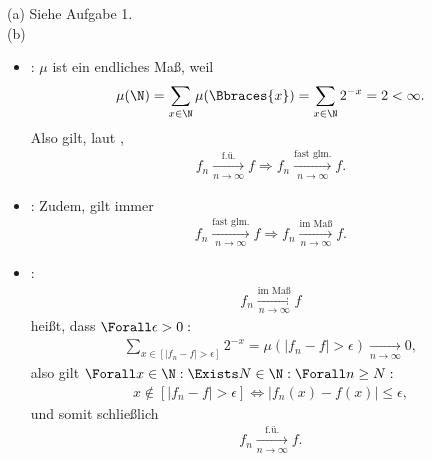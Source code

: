 \begin{solution}

(a) Siehe Aufgabe 1. \\

(b) \phantom{}

\begin{itemize}

  \item {}: $\mu$ ist ein endliches Maß, weil
  \begin{align*}
    \mu(\N)
    =
    \sum_{x \in \N} \mu(\Bbraces{x})
    =
    \sum_{x \in \N} 2^{-x}
    =
    2 < \infty.
  \end{align*}
  Also gilt, laut ,
  \begin{align*}
    f_n \xrightarrow[n \to \infty]{\text{f.ü.}} f
    \Rightarrow
    f_n \xrightarrow[n \to \infty]{\text{fast glm.}} f.
  \end{align*}

  \item {}: Zudem, gilt immer
  \begin{align*}
    f_n \xrightarrow[n \to \infty]{\text{fast glm.}} f
    \Rightarrow
    f_n \xrightarrow[n \to \infty]{\text{im Maß}} f.
  \end{align*}

  \item {}:
  \begin{align*}
    f_n \xrightarrow[n \to \infty]{\text{im Maß}} f
  \end{align*}
  heißt, dass $\Forall \epsilon > 0:$
  \begin{align*}
    \sum_{x \in [|f_n - f| > \epsilon]} 2^{-x}
    =
    \mu(|f_n - f| > \epsilon)
    \xrightarrow[n \to \infty]{} 0,
  \end{align*}
  also gilt $\Forall x \in \N: \Exists N \in \N: \Forall n \geq N:$
  \begin{align*}
    x \notin [|f_n - f| > \epsilon]
    \Leftrightarrow
    |f_n(x) - f(x)| \leq \epsilon,
  \end{align*}
  und somit schließlich
  \begin{align*}
    f_n \xrightarrow[n \to \infty]{\text{f.ü.}} f.
  \end{align*}

\end{itemize}

\end{solution}

